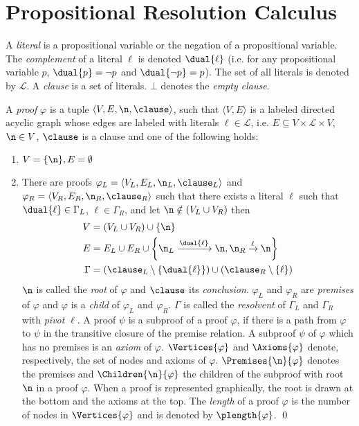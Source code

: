 \section{Propositional Resolution Calculus}
\label{sec:Resolution}

A \emph{literal} is a propositional variable or the negation of a propositional variable. The
\emph{complement} of a literal $\ell$ is denoted $\dual{\ell}$ (i.e. for any propositional variable $p$,
$\dual{p} = \neg p$ and $\dual{\neg p} = p$). The set of all literals is denoted by $\mathcal{L}$. A
\emph{clause} is a set of literals. $\bot$ denotes the \emph{empty clause}.


\begin{definition}[Proof] 
\label{def:proof}
A \emph{proof} $\varphi$ is a tuple $\langle V,E,\n,\clause \rangle$, 
such that $\langle V,E \rangle$ is a labeled directed acyclic graph whose edges are labeled with literals $\ell \in \mathcal{L}$, i.e. $E \subseteq V \times \mathcal{L} \times V$, $\n \in V$, $\clause$ is a clause 
and one of the following holds:

\begin{enumerate}
	\item $V = \{\n\}, E = \emptyset$
	\item \label{enum:resCase} There are proofs $\varphi_L = \langle V_L, E_L, \n_L,\clause_L \rangle$ and $\varphi_R = \langle V_R, E_R, \n_R, \clause_R \rangle$ such that there exists a literal
				$\ell$ such that $\dual{\ell} \in \Gamma_L$, $\ell \in \Gamma_R$, and let $\n \notin (V_L \cup V_R)$ then
		\begin{align*}
      V &= (V_L \cup V_R) \cup \{\n \} \\
      E &= E_L \cup E_R \cup
                    \left\{\n_L \xrightarrow{\dual{\ell}} \n , \n_R \xrightarrow{\ell} \n \right\} \\
     \Gamma &= \left( \clause_L \setminus \left\{ \dual{\ell} \right\} \right) \cup \left( \clause_R
                    \setminus \left\{ \ell \right\} \right)
    \end{align*}
		$\n$ is called the \emph{root} of $\varphi$ and $\clause$ its \emph{conclusion}.
		$\varphi_L$ and $\varphi_R$ are \emph{premises} of $\varphi$ and $\varphi$ is a \emph{child} of $\varphi_L$ and $\varphi_R$.
		$\Gamma$ is called the \emph{resolvent} of $\Gamma_L$ and $\Gamma_R$ with \emph{pivot} $\ell$.
		A proof $\psi$ is a subproof of a proof $\varphi$, if there is a path from $\varphi$ to $\psi$ in the transitive closure of the premise relation.
		A subproof $\psi$ of $\varphi$ which has no premises is an \emph{axiom} of $\varphi$.
		$\Vertices{\varphi}$ and $\Axioms{\varphi}$ denote, respectively, the set of nodes and axioms of $\varphi$. $\Premises{\n}{\varphi}$ denotes the premises and $\Children{\n}{\varphi}$ the children of the subproof with root $\n$ in a proof $\varphi$. When a proof is represented graphically, the root is drawn at the bottom and the axioms at the top. The \emph{length} of a proof $\varphi$ is the number of nodes in $\Vertices{\varphi}$ and is denoted by $\plength{\varphi}$.
\qed
\end{enumerate}

\end{definition}

